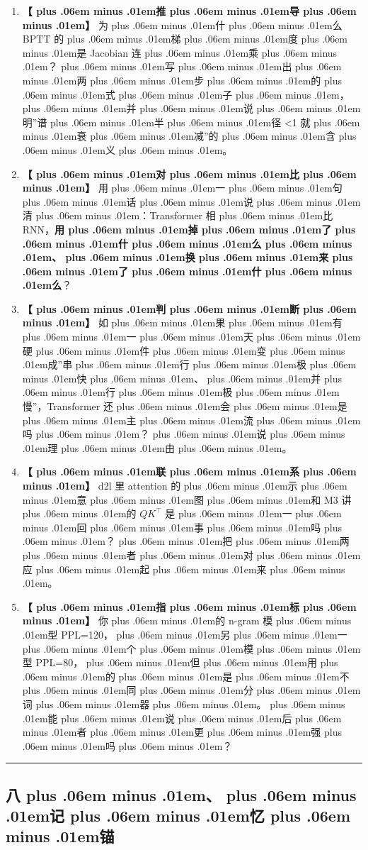 \documentclass[
]{article}
\providecommand{\tightlist}{%
  \setlength{\itemsep}{0pt}\setlength{\parskip}{0pt}}
\def\zh#1{{\zhfont #1}}
\def\zhglue{\hskip0pt plus .06em minus .01em}
\begin{document}
\begin{enumerate}
\def\labelenumi{\arabic{enumi}.}
\tightlist
\item
  \textbf{\zh{【\zhglue 推\zhglue 导\zhglue 】}} \zh{为\zhglue 什\zhglue 么} BPTT \zh{的\zhglue 梯\zhglue 度\zhglue 是} Jacobian \zh{连\zhglue 乘\zhglue ？\zhglue 写\zhglue 出\zhglue 两\zhglue 步\zhglue 的\zhglue 式\zhglue 子\zhglue ，\zhglue 并\zhglue 说\zhglue 明}''\zh{谱\zhglue 半\zhglue 径} \textless1 \zh{就\zhglue 衰\zhglue 减}''\zh{的\zhglue 含\zhglue 义\zhglue 。}
\item
  \textbf{\zh{【\zhglue 对\zhglue 比\zhglue 】}} \zh{用\zhglue 一\zhglue 句\zhglue 话\zhglue 说\zhglue 清\zhglue ：}Transformer \zh{相\zhglue 比} RNN\zh{，}\textbf{\zh{用\zhglue 掉\zhglue 了\zhglue 什\zhglue 么\zhglue 、\zhglue 换\zhglue 来\zhglue 了\zhglue 什\zhglue 么}}\zh{？}
\item
  \textbf{\zh{【\zhglue 判\zhglue 断\zhglue 】}} \zh{如\zhglue 果\zhglue 有\zhglue 一\zhglue 天\zhglue 硬\zhglue 件\zhglue 变\zhglue 成}''\zh{串\zhglue 行\zhglue 极\zhglue 快\zhglue 、\zhglue 并\zhglue 行\zhglue 极\zhglue 慢}''\zh{，}Transformer \zh{还\zhglue 会\zhglue 是\zhglue 主\zhglue 流\zhglue 吗\zhglue ？\zhglue 说\zhglue 理\zhglue 由\zhglue 。}
\item
  \textbf{\zh{【\zhglue 联\zhglue 系\zhglue 】}} d2l \zh{里} attention \zh{的\zhglue 示\zhglue 意\zhglue 图\zhglue 和} M3 \zh{讲\zhglue 的} \(QK^\top\) \zh{是\zhglue 一\zhglue 回\zhglue 事\zhglue 吗\zhglue ？\zhglue 把\zhglue 两\zhglue 者\zhglue 对\zhglue 应\zhglue 起\zhglue 来\zhglue 。}
\item
  \textbf{\zh{【\zhglue 指\zhglue 标\zhglue 】}} \zh{你\zhglue 的} n-gram \zh{模\zhglue 型} PPL=120\zh{，\zhglue 另\zhglue 一\zhglue 个\zhglue 模\zhglue 型} PPL=80\zh{，\zhglue 但\zhglue 用\zhglue 的\zhglue 是\zhglue 不\zhglue 同\zhglue 分\zhglue 词\zhglue 器\zhglue 。\zhglue 能\zhglue 说\zhglue 后\zhglue 者\zhglue 更\zhglue 强\zhglue 吗\zhglue ？}
\end{enumerate}

\begin{center}\rule{0.5\linewidth}{0.5pt}\end{center}

\subsection{\zh{八\zhglue 、\zhglue 记\zhglue 忆\zhglue 锚}}\label{ux516bux8bb0ux5fc6ux951a-1}
\end{document}
